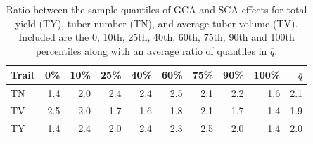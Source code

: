 \begin{table}
\centering
\caption{Ratio between the sample quantiles of GCA and SCA effects for total yield (TY), tuber number (TN), and average tuber volume (TV). Included are the 0, 10th, 25th, 40th, 60th, 75th, 90th and 100th percentiles along with an average ratio of quantiles in $\overline{q}$.}
\label{tab:gca-sca-ratios}
\centering
\begin{tabular}[t]{lrrrrrrrrr}
\toprule
Trait & 0\% & 10\% & 25\% & 40\% & 60\% & 75\% & 90\% & 100\% & $\overline{q}$\\
\midrule
TN & 1.4 & 2.0 & 2.4 & 2.4 & 2.5 & 2.1 & 2.2 & 1.6 & 2.1\\
TV & 2.5 & 2.0 & 1.7 & 1.6 & 1.8 & 2.1 & 1.7 & 1.4 & 1.9\\
TY & 1.4 & 2.4 & 2.0 & 2.4 & 2.3 & 2.5 & 2.0 & 1.4 & 2.0\\
\bottomrule
\end{tabular}
\end{table}

\let\thetable\originalthetable
\let\thefigure\originalthefigure

